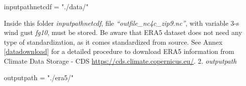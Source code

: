 \documentclass[12pt,twoside]{reedthesis}
\newenvironment{Shaded}{\begin{snugshade}}{\end{snugshade}}
\newcommand{\NormalTok}[1]{#1}
\newcommand{\StringTok}[1]{\textcolor[rgb]{0.31,0.60,0.02}{#1}}
\begin{document}
\vspace{0.4cm}
\begin{Shaded}
\begin{Highlighting}[]
\NormalTok{      inputpathnetcdf =}\StringTok{ "./data/"}
\end{Highlighting}
\end{Shaded}
\normalsize

Inside this folder \emph{inputpathnetcdf}, file \emph{``outfile\_nc4c\_zip9.nc''}, with variable 3-s wind gust \emph{fg10}, must be stored. Be aware that ERA5 dataset does not need any type of standardization, as it comes standardized from source. See Annex \ref{datadownload} for a detailed procedure to download ERA5 information from Climate Data Storage - CDS \url{https://cds.climate.copernicus.eu/}.
2. \emph{outputpath}

\scriptsize

\vspace{0.4cm}
\begin{Shaded}
\begin{Highlighting}[]
\NormalTok{      outputpath =}\StringTok{ "./era5/"}
\end{Highlighting}
\end{Shaded}
\normalsize
\end{document}
